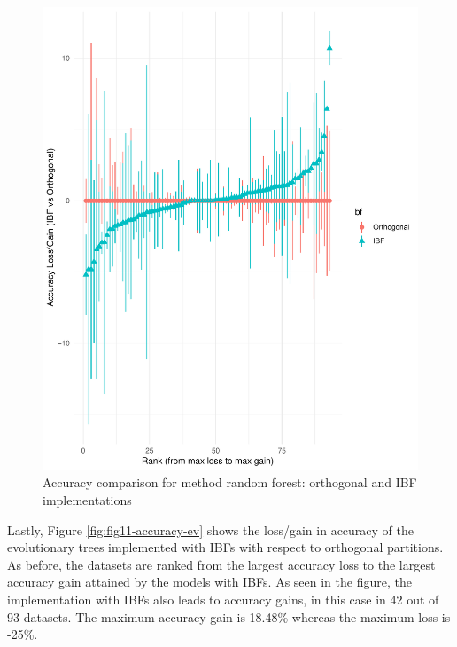 \documentclass[]{elsarticle} %
\makeatletter
\def\maxwidth{\ifdim\Gin@nat@width>\linewidth\linewidth
\else\Gin@nat@width\fi}
\let\Oldincludegraphics\includegraphics
\renewcommand{\includegraphics}[1]{\Oldincludegraphics[width=\maxwidth]{#1}}
\makeatother
\begin{document}
\begin{figure}
\centering
\includegraphics{Trees_with_Base_Functions_v2_files/figure-latex/fig10-accuracy-forest-1.pdf}
\caption{\label{fig:fig10-accuracy-forest}Accuracy comparison for method
random forest: orthogonal and IBF implementations}
\end{figure}

Lastly, Figure \ref{fig:fig11-accuracy-ev} shows the loss/gain in
accuracy of the evolutionary trees implemented with IBFs with respect to
orthogonal partitions. As before, the datasets are ranked from the
largest accuracy loss to the largest accuracy gain attained by the
models with IBFs. As seen in the figure, the implementation with IBFs
also leads to accuracy gains, in this case in 42 out of 93 datasets. The
maximum accuracy gain is 18.48\% whereas the maximum loss is -25\%.
\end{document}
